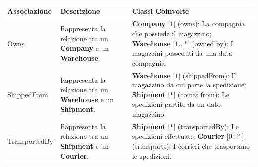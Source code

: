 \begin{tabularx}{\textwidth}{YYY}
  \toprule
  \textbf{Associazione} & \textbf{Descrizione} & \textbf{Classi Coinvolte} \\
  \midrule
  Owns &
  \begin{minipage}[c]{\linewidth}
    \vspace{0.5cm}
    Rappresenta la relazione tra un \textbf{Company} e un \textbf{Warehouse}. \newline
  \end{minipage} &
  \begin{minipage}[c]{\linewidth}
    \vspace{0.5cm}
    \textbf{Company} [\(1\)] (owns): La compagnia che possiede il magazzino; \newline
    \textbf{Warehouse} [\(1..*\)] (owned by):  I magazzini posseduti da una data compagnia. \newline
  \end{minipage} \\

  ShippedFrom &
  \begin{minipage}[c]{\linewidth}
    \vspace{0.5cm}
    Rappresenta la relazione tra un \textbf{Warehouse} e un \textbf{Shipment}. \newline
  \end{minipage} &
  \begin{minipage}[c]{\linewidth}
    \vspace{0.5cm}
    \textbf{Warehouse} [\(1\)]  (shippedFrom):  Il magazzino da cui parte la spedizione; \newline
    \textbf{Shipment} [\(*\)] (comes from): Le spedizioni partite da un dato magazzino. \newline
  \end{minipage} \\

  TransportedBy &
  \begin{minipage}[c]{\linewidth}
    \vspace{0.5cm}
    Rappresenta la relazione tra un \textbf{Shipment} e un \textbf{Courier}. \newline
  \end{minipage} &
  \begin{minipage}[c]{\linewidth}
    \vspace{0.5cm}
    \textbf{Shipment} [\(*\)]  (transportedBy): Le spedizioni effettuate; \newline
    \textbf{Courier} [\(0..*\)] (transports): I corrieri che trasportano le spedizioni. \newline
  \end{minipage} \\


\end{tabularx}

